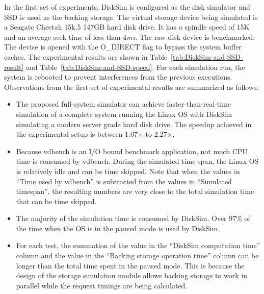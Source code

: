 In the first set of experiments, DiskSim is configured as the disk simulator and SSD is used as the backing storage. The virtual storage device being simulated is a Seagate Cheetah 15k.5 147GB hard disk drive. It has a spindle speed of 15K and an average seek time of less than 4\textit{ms}. The raw disk device is benchmarked. The device is opened with the O_DIRECT flag to bypass the system buffer caches. The experimental results are shown in Table~\ref{tab:DiskSim-and-SSD-result} and Table~\ref{tab:DiskSim-and-SSD-speed}. For each simulation run, the system is rebooted to prevent interferences from the previous executions. Observations from the first set of experimental results are summarized as follows.

\begin{itemize}
	\item The proposed full-system simulator can achieve faster-than-real-time simulation of a complete system running the Linux OS with DiskSim simulating a modern server grade hard disk drive. The speedup achieved in the experimental setup is between 1.07$\times$ to 2.27$\times$.
	
	\item Because vdbench is an I/O bound benchmark application, not much CPU time is consumed by vdbench. During the simulated time span, the Linux OS is relatively idle and can be time skipped. Note that when the values in ``Time used by vdbench'' is subtracted from  the values in ``Simulated timespan'', the resulting numbers are very close to the total simulation time that can be time skipped.
	
	\item The majority of the simulation time is consumed by DiskSim. Over 97\% of the time when the OS is in the paused mode is used by DiskSim.
	
	\item For each test, the summation of the value in the ``DiskSim computation time'' column and the value in the ``Backing storage operation time'' column can be longer than the total time spent in the paused mode. This is because the design of the storage simulation module allows backing storage to work in parallel while the request timings are being calculated.
\end{itemize}

